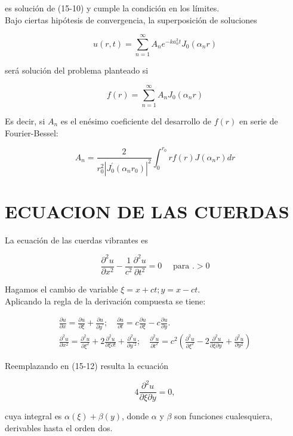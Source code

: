 \documentclass[10pt]{article}
\theoremstyle{plain}
\theoremstyle{definition}
\theoremstyle{remark}
\begin{document}
es solución de (15-10) y cumple la condición en los límites.\\
Bajo ciertas hipótesis de convergencia, la superposición de soluciones

$$
u(r, t)=\sum_{n=1}^{\infty} A_{n} e^{-k a_{n}^{2} t} J_{0}\left(\alpha_{n} r\right)
$$

será solución del problema planteado si

$$
f(r)=\sum_{n=1}^{\infty} A_{n} J_{0}\left(\alpha_{n} r\right)
$$

Es decir, si $A_{n}$ es el enésimo coeficiente del desarrollo de $f(r)$ en serie de Fourier-Bessel:

$$
A_{n}=\frac{2}{r_{0}^{2}\left|J_{0}^{\prime}\left(\alpha_{n} r_{0}\right)\right|^{2}} \int_{0}^{r_{0}} r f(r) J\left(\alpha_{n} r\right) d r
$$

\section*{ECUACION DE LAS CUERDAS}
La ecuación de las cuerdas vibrantes es


\begin{equation*}
\frac{\partial^{2} u}{\partial x^{2}}-\frac{1}{c^{2}} \frac{\partial^{2} u}{\partial t^{2}}=0 \quad \text { para } .>0 \tag{$15\cdot12$}
\end{equation*}


Hagamos el cambio de variable $\xi=x+c t ; y=x-c t$.\\
Aplicando la regla de la derivación compuesta se tiene:

$$
\begin{gathered}
\frac{\partial u}{\partial x}=\frac{\partial u}{\partial \xi}+\frac{\partial u}{\partial y^{\prime}} ; \quad \frac{\partial u}{\partial t}=c \frac{\partial u}{\partial \xi}-c \frac{\partial u}{\partial y} . \\
\frac{\partial^{2} u}{\partial x^{2}}=\frac{\partial^{2} u}{\partial \xi^{2}}+2 \frac{\partial^{2} u}{\partial \xi \partial!}+\frac{\partial^{2} u}{\partial y^{\prime 2}} ; \quad \frac{\partial^{2} u}{\partial t^{2}}=c^{2}\left(\frac{\partial^{2} u}{\partial \xi^{2}}-2 \frac{\partial^{2} u}{\partial \xi \partial y^{\prime}}+\frac{\partial^{2} u}{\partial y^{2}}\right)
\end{gathered}
$$

Reemplazando en (15-12) resulta la ecuación

$$
4 \frac{\partial^{2} u}{\partial \xi \partial y}=0,
$$

cuya integral es $\alpha(\xi)+\beta(y)$, donde $\alpha$ y $\beta$ son funciones cualesquiera, derivables hasta el orden dos.
\end{document}

